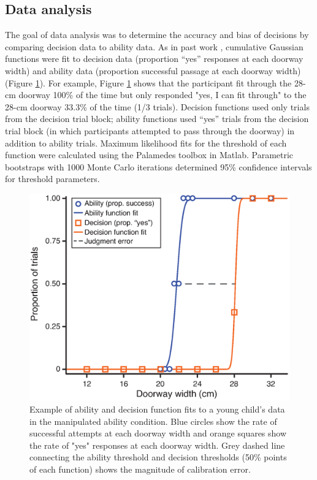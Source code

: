 \documentclass[a4paper,man,natbib,floatsintext,noextraspace]{apa6}
\begin{document}
\subsection{Data analysis}

The goal of data analysis was to determine the accuracy and bias of decisions by comparing decision data to ability data. As in past work \citep{Recal,PregAps}, cumulative Gaussian functions were fit to decision data (proportion “yes” responses at each doorway width) and ability data (proportion successful passage at each doorway width) (Figure \ref{fig:curvefit}). For example, Figure \ref{fig:curvefit} shows that the participant fit through the 28-cm doorway 100\% of the time but only responded "yes, I can fit through" to the 28-cm doorway 33.3\% of the time (1/3 trials). Decision functions used only trials from the decision trial block; ability functions used “yes” trials from the decision trial block (in which participants attempted to pass through the doorway) in addition to ability trials. Maximum likelihood fits for the threshold of each function were calculated using the Palamedes toolbox \citep{KingdomPrins} in Matlab. Parametric bootstraps with 1000 Monte Carlo iterations determined 95\% confidence intervals for threshold parameters. 

\begin{figure}[htb!]
\centering
\includegraphics[width=.85\textwidth]{curvefit.eps}
\caption{\label{fig:curvefit}Example of ability  and decision function fits to a young child's data in the manipulated ability condition. Blue circles show the rate of successful attempts at each doorway width and orange squares show the rate of "yes" responses at each doorway width. Grey dashed line connecting the ability threshold and decision thresholds (50\% points of each function) shows the magnitude of calibration error.}
\end{figure}
\end{document}
